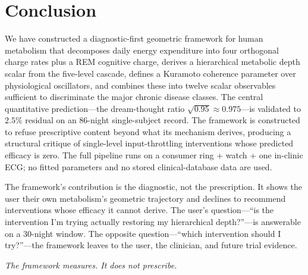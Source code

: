 \documentclass[11pt,twocolumn,a4paper]{article}
\theoremstyle{definition}
\theoremstyle{remark}
\begin{document}
\section{Conclusion}

We have constructed a diagnostic-first geometric framework for
human metabolism that decomposes daily energy expenditure into four
orthogonal charge rates plus a REM cognitive charge, derives a
hierarchical metabolic depth scalar from the five-level cascade,
defines a Kuramoto coherence parameter over physiological
oscillators, and combines these into twelve scalar observables
sufficient to discriminate the major chronic disease classes. The
central quantitative prediction---the dream-thought ratio
$\sqrt{0.95} \approx 0.975$---is validated to $2.5\%$ residual on
an 86-night single-subject record. The framework is constructed to
refuse prescriptive content beyond what its mechanism derives,
producing a structural critique of single-level input-throttling
interventions whose predicted efficacy is zero. The full pipeline
runs on a consumer ring + watch + one in-clinic ECG; no fitted
parameters and no stored clinical-database data are used.

The framework's contribution is the diagnostic, not the prescription.
It shows the user their own metabolism's geometric trajectory and
declines to recommend interventions whose efficacy it cannot derive.
The user's question---``is the intervention I'm trying actually
restoring my hierarchical depth?''---is answerable on a 30-night
window. The opposite question---``which intervention should I
try?''---the framework leaves to the user, the clinician, and
future trial evidence.

\medskip
\noindent\textit{The framework measures. It does not prescribe.}



\end{document}
